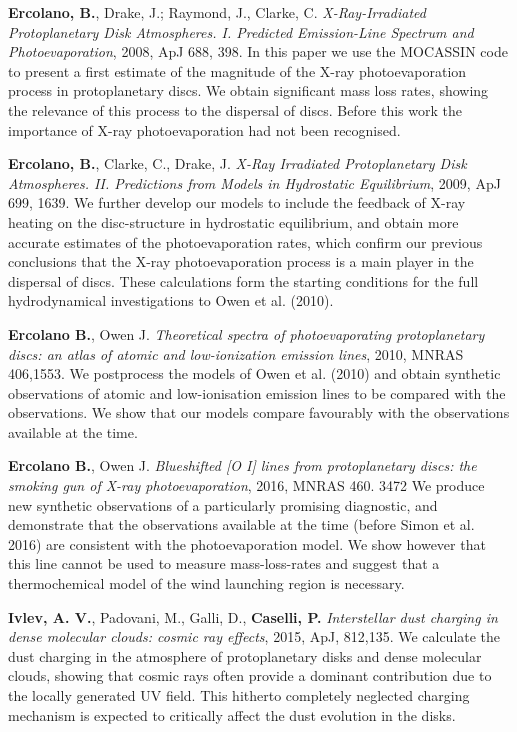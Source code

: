 \documentclass[10pt,fleqn,twoside]{article}
\begin{document}
\begin{literature}
\item \textbf{Ercolano, B.},  Drake, J.; Raymond, J., Clarke, C.
  \textit{X-Ray-Irradiated Protoplanetary Disk Atmospheres. I. Predicted Emission-Line Spectrum and Photoevaporation}, 2008, ApJ
  688, 398. In this paper we use the MOCASSIN code to present a first
  estimate of the magnitude of the X-ray photoevaporation process in
  protoplanetary discs. We obtain significant mass loss rates, showing
  the relevance of this process to the dispersal of discs. Before this work the
  importance of X-ray photoevaporation had not been recognised.  

\item \textbf{Ercolano, B.}, Clarke, C., Drake, J. \textit{X-Ray
    Irradiated Protoplanetary Disk Atmospheres. II. Predictions from
    Models in Hydrostatic Equilibrium}, 2009, ApJ 699, 1639. We
  further develop our models to include the feedback of X-ray heating
  on the disc-structure in hydrostatic equilibrium, and obtain more
  accurate estimates of the photoevaporation rates, which confirm our
  previous conclusions that the X-ray photoevaporation process is a
  main player in the dispersal of discs. These calculations form the
  starting conditions for the full hydrodynamical investigations to
  Owen et al. (2010). 

\item \textbf{Ercolano B.}, Owen J. {\em Theoretical spectra of
    photoevaporating protoplanetary discs: an atlas of atomic and
    low-ionization emission lines}, 2010, MNRAS 406,1553. We postprocess the
  models of Owen et al. (2010) and obtain synthetic observations of
  atomic and low-ionisation emission lines to be compared with the
  observations. We show that our models compare favourably with the
  observations available at the time.

\item \textbf{Ercolano B.}, Owen J.  {\em Blueshifted [O I] lines from
    protoplanetary discs: the smoking gun of X-ray photoevaporation},
  2016, MNRAS 460. 3472
  We produce new synthetic observations of a particularly promising
  diagnostic, and demonstrate that the observations available at the
  time (before Simon et al. 2016) are consistent with the
  photoevaporation model. We show however that this line cannot be
  used to measure mass-loss-rates and suggest that a thermochemical
  model of the wind launching region is necessary. 

\item \textbf{Ivlev, A. V.}, Padovani, M., Galli, D., \textbf{Caselli,
    P.} \textit{Interstellar dust charging in dense molecular clouds:
    cosmic ray effects}, 2015, ApJ, 812,135. We calculate the dust
  charging in the atmosphere of protoplanetary disks and dense
  molecular clouds, showing that cosmic rays often provide a dominant
  contribution due to the locally generated UV field. This hitherto
  completely neglected charging mechanism is expected to critically
  affect the dust evolution in the disks. 
 

\end{literature}
\end{document}
